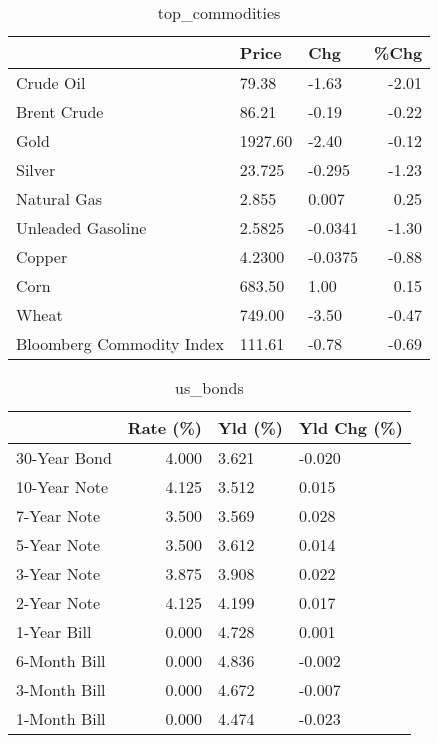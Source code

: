 \documentclass{article}%
\begin{document}
\begin{table}[htbp]%
\caption{top\_commodities}%
\centering%
\begin{adjustbox}{width=1\textwidth}%
\begin{tabular}{lllr}
\toprule
                          &   Price &     Chg &  \%Chg \\
\midrule
               Crude Oil  &   79.38 &   -1.63 & -2.01 \\
             Brent Crude  &   86.21 &   -0.19 & -0.22 \\
                    Gold  & 1927.60 &   -2.40 & -0.12 \\
                  Silver  &  23.725 &  -0.295 & -1.23 \\
             Natural Gas  &   2.855 &   0.007 &  0.25 \\
       Unleaded Gasoline  &  2.5825 & -0.0341 & -1.30 \\
                  Copper  &  4.2300 & -0.0375 & -0.88 \\
                    Corn  &  683.50 &    1.00 &  0.15 \\
                   Wheat  &  749.00 &   -3.50 & -0.47 \\
Bloomberg Commodity Index &  111.61 &   -0.78 & -0.69 \\
\bottomrule
\end{tabular}
%
\end{adjustbox}%
\end{table}

%


\begin{table}[htbp]%
\caption{us\_bonds}%
\centering%
\begin{adjustbox}{width=1\textwidth}%
\begin{tabular}{lrll}
\toprule
             &  Rate (\%) & Yld (\%) & Yld Chg (\%) \\
\midrule
30-Year Bond &     4.000 &   3.621 &      -0.020 \\
10-Year Note &     4.125 &   3.512 &       0.015 \\
 7-Year Note &     3.500 &   3.569 &       0.028 \\
 5-Year Note &     3.500 &   3.612 &       0.014 \\
 3-Year Note &     3.875 &   3.908 &       0.022 \\
 2-Year Note &     4.125 &   4.199 &       0.017 \\
 1-Year Bill &     0.000 &   4.728 &       0.001 \\
6-Month Bill &     0.000 &   4.836 &      -0.002 \\
3-Month Bill &     0.000 &   4.672 &      -0.007 \\
1-Month Bill &     0.000 &   4.474 &      -0.023 \\
\bottomrule
\end{tabular}
%
\end{adjustbox}%
\end{table}
\end{document}
